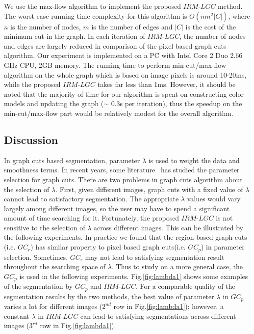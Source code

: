        We use the max-flow algorithm \cite{yuri_pami2} to implement the proposed $IRM$-$LGC$ method.
        The worst case running time complexity for this algorithm is $O(mn^2|C|)$, where $n$ is
        the number of nodes, $m$ is the number of edges and $|C|$ is the cost of the minimum
        cut in the graph. In each iteration of $IRM$-$LGC$, the number of nodes and edges
        are largely reduced in comparison of the pixel based graph cuts algorithm.
        Our experiment is implemented on a PC with Intel Core 2 Duo 2.66 GHz CPU,
        2GB memory. The running time to perform min-cut/max-flow algorithm on the whole
        graph which is based on image pixels is around 10-20ms, while the proposed
        $IRM$-$LGC$ takes far less than 1ms. However, it should be noted that the majority of time for
        our algorithm is spent on constructing color models and updating the graph ($\sim$ 0.3s per iteration), thus the speedup on the min-cut/max-flow part would be relatively modest for the overall algorithm.

    \subsection{Discussion} \label{IGC:experiment:discussion}
    In graph cuts based segmentation, parameter $\lambda$  is used to weight the data and
    smoothness terms. In recent years, some literature~\cite{Kolmogorov_para,Peng2} has studied the
    parameter selection for graph cuts. There are two problems in graph cuts
    algorithm about the selection of $\lambda$. First, given different images, graph
    cuts with a fixed value of $\lambda$ cannot lead to satisfactory segmentation. The
    appropriate $\lambda$ values would vary largely among different images, so the user
    may have to spend a significant amount of time searching for it. Fortunately,
    the proposed $IRM$-$LGC$ is not sensitive to the selection of $\lambda$ across different
    images.  This can be illustrated by the following experiments. In practice we found that
    the region based graph cuts (i.e. $GC_r$) has similar property to pixel based graph
    cuts(i.e. $GC_p$) in parameter selection. Sometimes, $GC_r$ may not lead to satisfying
    segmentation result throughout the searching space of $\lambda$.
    Thus to study on a more general case, the $GC_p$ is used in the following experiments.
    Fig.\ref{fig:lambda1} shows some examples of the segmentation by $GC_p$ and $IRM$-$LGC$. For a
    comparable quality of the segmentation results by the two methods, the best
    value of parameter $\lambda$ in $GC_p$ varies a lot for different images ($2^{nd}$ row in Fig.\ref{fig:lambda1});
     however, a constant $\lambda$ in $IRM$-$LGC$ can lead to satisfying segmentations across
     different images ($3^{rd}$ row in Fig.\ref{fig:lambda1}).

